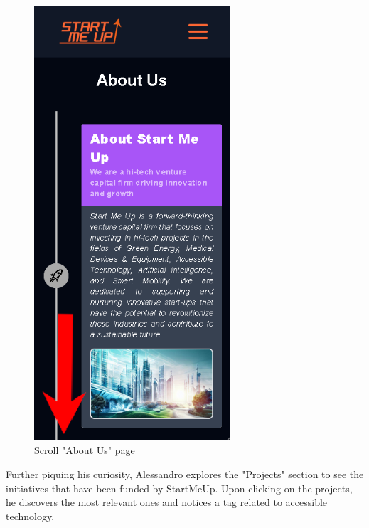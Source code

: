 \documentclass[11pt, letterpaper]{article}
\begin{document}
\begin{figure}[H]
\begin{minipage}[b]{0.4\textwidth}
    \includegraphics[width=7.3cm]{images/Scenarios/Scenario4/Screen4.png}
    \caption{Scroll "About Us" page}
    \label{fig:scenario4_4}
  \end{minipage}
\end{figure}
\noindent
Further piquing his curiosity, Alessandro explores the "Projects" section to see the initiatives that have been funded by StartMeUp. Upon clicking on the projects, he discovers the most relevant ones and notices a tag related to accessible technology.
\end{document}
